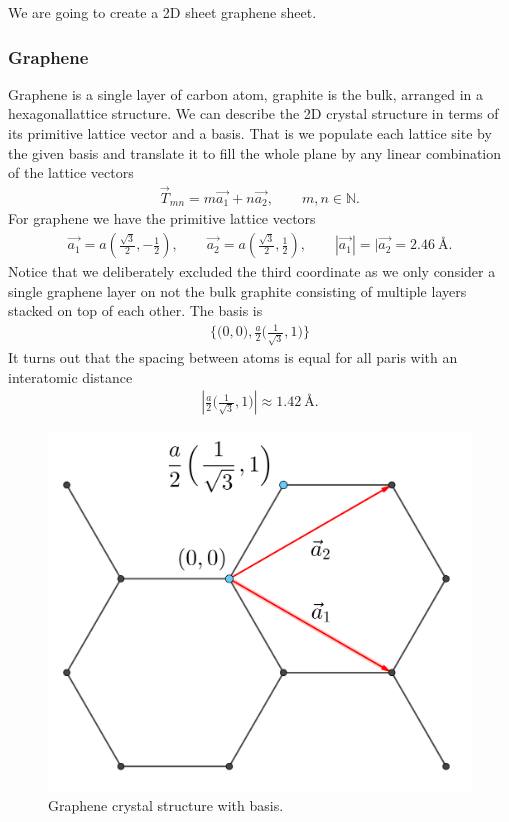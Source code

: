 We are going to create a 2D sheet graphene sheet. 

\subsubsection{Graphene}

Graphene is a single layer of carbon atom, graphite is the bulk, arranged in a hexagonallattice structure. We can describe the 2D crystal structure in terms of its primitive lattice vector and a basis. That is we populate each lattice site by the given basis and translate it to fill the whole plane by any linear combination of the lattice vectors
\begin{align*}
  \vec{T}_{mn} = m\vec{a_1} + n\vec{a_2}, \qquad m,n \in \mathbb{N}.
\end{align*}
For graphene we have the primitive lattice vectors 
\begin{align*}
  \vec{a_1} = a \left(\frac{\sqrt{3}}{2}, -\frac{1}{2}\right), \qquad \vec{a_2} = a \left(\frac{\sqrt{3}}{2}, \frac{1}{2}\right), \qquad |\vec{a_1}| = |\vec{a_2} = 2.46 \ \text{Å}.
\end{align*}
Notice that we deliberately excluded the third coordinate as we only consider a single graphene layer on not the bulk graphite consisting of multiple layers stacked on top of each other. The basis is 
\begin{align*}
  \Big\{\Big(0,0\Big), \frac{a}{2}\Big(\frac{1}{\sqrt{3}}, 1 \Big) \Big\}
\end{align*}
It turns out that the spacing between atoms is equal for all paris with an interatomic distance 
\begin{align*}
  \left|\frac{a}{2}\Big(\frac{1}{\sqrt{3}}, 1 \Big)\right| \approx 1.42 \ \text{Å}.
\end{align*}


\begin{figure}[H]
  \centering
  \includegraphics[width=0.3\linewidth]{figures/crystal.png}
  \caption{Graphene crystal structure with basis.}
  \label{fig:graphene_crystal}
\end{figure}


